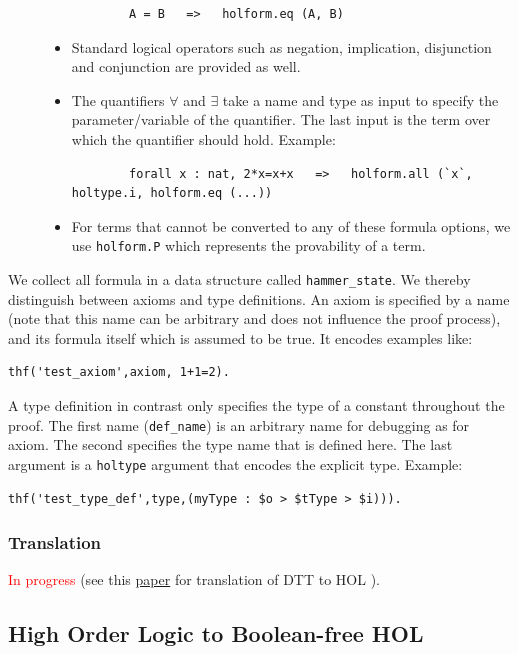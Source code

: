 \documentclass[a4paper]{article}
\begin{document}
\begin{description}
\begin{itemize}
		\begin{verbatim}
		A = B   =>   holform.eq (A, B)
		\end{verbatim}
		\item Standard logical operators such as negation, implication, disjunction and conjunction are provided as well.
		\item The quantifiers $\forall$ and $\exists$ take a name and type as input to specify the parameter/variable of the quantifier. The last input is the term over which the quantifier should hold. Example:
		\begin{verbatim}
		forall x : nat, 2*x=x+x   =>   holform.all (`x`, holtype.i, holform.eq (...))
		\end{verbatim}
		\item For terms that cannot be converted to any of these formula options, we  use \texttt{holform.P} which represents the provability of a term.
	\end{itemize}
\end{description}

We collect all formula in a data structure called \texttt{hammer\_state}. We thereby distinguish between axioms and type definitions. An axiom is specified by a name (note that this name can be arbitrary and does not influence the proof process), and its formula itself which is assumed to be true. It encodes examples like:
\begin{verbatim}
thf('test_axiom',axiom, 1+1=2).
\end{verbatim}
A type definition in contrast only specifies the type of a constant throughout the proof. The first name (\texttt{def\_name}) is an arbitrary name for debugging as for axiom. The second specifies the type name that is defined here. The last argument is a \texttt{holtype} argument that encodes the explicit type. Example:

\begin{verbatim}
thf('test_type_def',type,(myType : $o > $tType > $i))).
\end{verbatim}

\subsubsection{Translation}
\textcolor{red}{In progress} (see this \href{https://link.springer.com/chapter/10.1007/BFb0037108}{paper} for translation of DTT to HOL \cite{DTT2HOL}). 
\subsection{High Order Logic to Boolean-free HOL}
\end{document}
